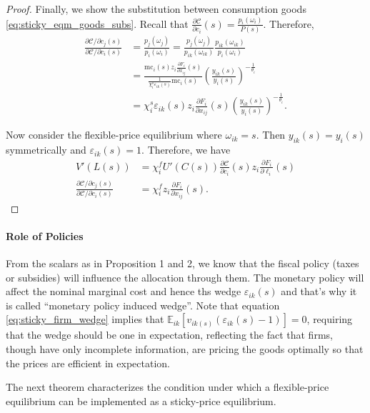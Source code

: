 \documentclass[12pt]{article}
\numberwithin{equation}{section}
\begin{document}
\begin{proof}
    Finally, we show the substitution between consumption goods \eqref{eq:sticky_eqm_goods_subs}. Recall that $\frac{\partial \mathcal{C}}{\partial c_i}(s) = \frac{p_{i}(\omega_i)}{P(s)}$. Therefore,
    \begin{align*}
        \frac{\partial \mathcal{C}/\partial c_j(s)}{\partial \mathcal{C}/\partial c_i(s)} &= \frac{p_{j}(\omega_j)}{p_{i}(\omega_i)} = \frac{p_{j}(\omega_j)}{p_{ik}(\omega_{ik})} \frac{p_{ik}(\omega_{ik})}{p_{i}(\omega_i)} \\
        &= \frac{\text{mc}_i(s) z_i \frac{\partial F_i}{\partial x_{ij}}(s)}{\frac{1}{\chi_i^s \varepsilon_{ik}(s)} \text{mc}_i(s)} \left(\frac{y_{ik}(s)}{y_i(s)}\right)^{-\frac{1}{\theta_i}} \\
        &= \chi_i^s \varepsilon_{ik}(s) z_i \frac{\partial F_i}{\partial x_{ij}}(s) \left(\frac{y_{ik}(s)}{y_i(s)}\right)^{-\frac{1}{\theta_i}}.
    \end{align*}

    Now consider the flexible-price equilibrium where $\omega_{ik} = s$. Then $y_{ik}(s) = y_i(s)$ symmetrically and $\varepsilon_{ik}(s) = 1$. Therefore, we have 
    \begin{align*}
        V'(L(s)) &= \chi_i^f U'(C(s)) \frac{\partial \mathcal{C}}{\partial c_i}(s) z_i \frac{\partial F_i}{\partial \ell_i}(s)  \\
        \frac{\partial \mathcal{C}/\partial c_j(s)}{\partial \mathcal{C}/\partial c_i(s)} &= \chi_i^f z_i \frac{\partial F_i}{\partial x_{ij}}(s).
    \end{align*}
\end{proof}

\paragraph{Role of Policies}
From the scalars as in Proposition 1 and 2, we know that the fiscal policy (taxes or subsidies) will influence the allocation through them. The monetary policy will affect the nominal marginal cost and hence ths wedge $\varepsilon_{ik}(s)$ and that's why it is called ``monetary policy induced wedge''. Note that equation \eqref{eq:sticky_firm_wedge} implies that $\mathbb{E}_{ik}[v_{ik(s)}(\varepsilon_{ik}(s) - 1)] = 0$, requiring that the wedge should be one in expectation, reflecting the fact that firms, though have only incomplete information, are pricing the goods optimally so that the prices are efficient in expectation.

The next theorem characterizes the condition under which a flexible-price equilibrium can be implemented as a sticky-price equilibrium.
\end{document}
